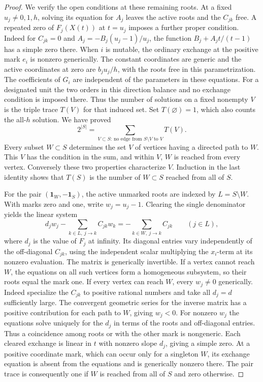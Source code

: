 \documentclass[11pt,reqno]{amsart}
\numberwithin{equation}{section}
\theoremstyle{definition}
\theoremstyle{remark}
\begin{document}
\begin{proof}
We verify the open conditions at these remaining roots. At a fixed
\(u_j\ne0,1,h\), solving its equation for \(A_j\) leaves the
active roots and the \(C_{jk}\) free. A repeated zero of
\(F_j(X(t))\) at \(t=u_j\) imposes a further proper condition. Indeed for
\(C_{jk}=0\) and
\(A_j=-B_j(u_j-1)/u_j\), the function
\(B_j+A_j t/(t-1)\) has a simple zero there. When \(i\) is mutable,
the ordinary exchange at the positive mark \(e_i\) is nonzero generically. The constant coordinates are generic and the active coordinates at zero are
\(b_j u_j/h\), with the roots free in this parametrization. The
coefficients of \(G_i\) are independent of the parameters in these equations.
For a designated unit the two orders in this direction balance and
no exchange condition is imposed there.
Thus the number of solutions on a fixed nonempty
\(V\) is the triple trace \(T(V)\) for that induced set. Set
\(T(\varnothing)=1\), which also counts the all-\(h\) solution.
We have proved
\[ 2^{|S|}=\sum_{V\subset S:\ \text{no edge from }S\setminus V \text{ to }V}T(V). \]
Every subset \(W\subset S\) determines the set \(V\) of vertices
having a directed path to \(W\). This \(V\) has the condition in
the sum, and within \(V\), \(W\) is reached from every vertex.
Conversely these two properties characterize \(V\). Induction in
the last identity shows that \(T(S)\) is the number of \(W\subset S\)
reached from all of \(S\).

For the pair \((\mathbf1_W,-\mathbf1_S)\), the active unmarked roots
are indexed by \(L=S\setminus W\). With marks zero and one, write
\(w_j=u_j-1\). Clearing the single denominator yields the linear system
\[ d_j w_j-\sum_{k\in L,\ j\to k}C_{jk} w_k =-\sum_{k\in W,\ j\to k}C_{jk}\qquad(j\in L), \]
where \(d_j\) is the value of \(F_j\) at infinity. Its diagonal
entries vary independently of the off-diagonal \(C_{jk}\), using
the independent scalar multiplying the \(x_i\)-term at its nonzero
evaluation. The matrix is generically invertible.
If a vertex cannot reach \(W\), the equations on all such vertices
form a homogeneous subsystem, so their roots equal the mark one.
If every vertex can reach \(W\), every \(w_j\ne0\) generically.
Indeed specialize the \(C_{jk}\) to positive rational numbers
and take all \(d_j=d\) sufficiently large. The convergent geometric
series for the inverse matrix has a positive contribution for each
path to \(W\), giving \(w_j<0\). For nonzero \(w_j\) the equations
solve uniquely for the \(d_j\) in terms of the roots and off-diagonal
entries. Thus a coincidence among roots or with the other mark
is nongeneric. Each cleared exchange is linear in \(t\) with
nonzero slope \(d_j\), giving a simple zero. At a positive coordinate
mark, which can occur only for a singleton \(W\), its exchange equation
is absent from the equations and is generically nonzero there.
The pair trace is consequently one if \(W\) is reached from all
of \(S\) and zero otherwise.


\end{proof}
\end{document}
